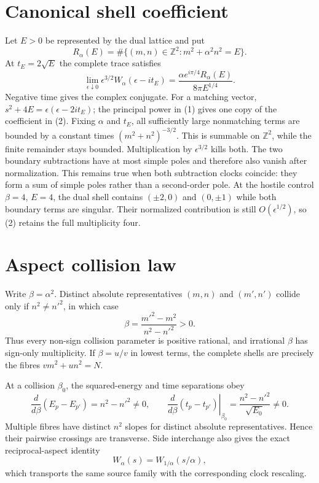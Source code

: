 \documentclass[10pt]{article}
\begin{document}
\section{Canonical shell coefficient}
Let $E>0$ be represented by the dual lattice and put
\[
R_\alpha(E)=\#\{(m,n)\in\mathbb Z^2:m^2+\alpha^2n^2=E\}.
\]
At $t_E=2\sqrt E$ the complete trace satisfies
\[
\boxed{\lim_{\epsilon\downarrow0}\epsilon^{3/2}
 W_\alpha(\epsilon-it_E)=
 \frac{\alpha e^{i\pi/4}R_\alpha(E)}{8\pi E^{1/4}}.} \tag{2}
\]
Negative time gives the complex conjugate.  For a matching vector,
$s^2+4E=\epsilon(\epsilon-2it_E)$; the principal power in (1) gives one
copy of the coefficient in (2).  Fixing $\alpha$ and $t_E$, all sufficiently
large nonmatching terms are bounded by a constant times
$(m^2+n^2)^{-3/2}$.  This is summable on $\mathbb Z^2$, while the finite
remainder stays bounded.  Multiplication by $\epsilon^{3/2}$ kills both.
The two boundary subtractions have at most simple poles and therefore also
vanish after normalization.  This remains true when both subtraction clocks
coincide: they form a sum of simple poles rather than a second-order pole.
At the hostile control $\beta=4$, $E=4$, the dual shell contains
$(\pm2,0)$ and $(0,\pm1)$ while both boundary terms are singular.  Their
normalized contribution is still $O(\epsilon^{1/2})$, so (2) retains the
full multiplicity four.

\section{Aspect collision law}
Write $\beta=\alpha^2$.  Distinct absolute representatives $(m,n)$ and
$(m',n')$ collide only if $n^2\ne n'^2$, in which case
\[
\boxed{\beta=\frac{m'^2-m^2}{n^2-n'^2}>0.} \tag{3}
\]
Thus every non-sign collision parameter is positive rational, and irrational
$\beta$ has sign-only multiplicity.  If $\beta=u/v$ in lowest terms, the
complete shells are precisely the fibres $vm^2+un^2=N$.

At a collision $\beta_0$, the squared-energy and time separations obey
\[
\frac{d}{d\beta}(E_p-E_{p'})=n^2-n'^2\ne0,
\qquad
\left.\frac{d}{d\beta}(t_p-t_{p'})\right|_{\beta_0}
=\frac{n^2-n'^2}{\sqrt{E_0}}\ne0. \tag{4}
\]
Multiple fibres have distinct $n^2$ slopes for distinct absolute
representatives.  Hence their pairwise crossings are transverse.  Side
interchange also gives the exact reciprocal-aspect identity
\[
W_\alpha(s)=W_{1/\alpha}(s/\alpha), \tag{5}
\]
which transports the same source family with the corresponding clock
rescaling.
\end{document}
